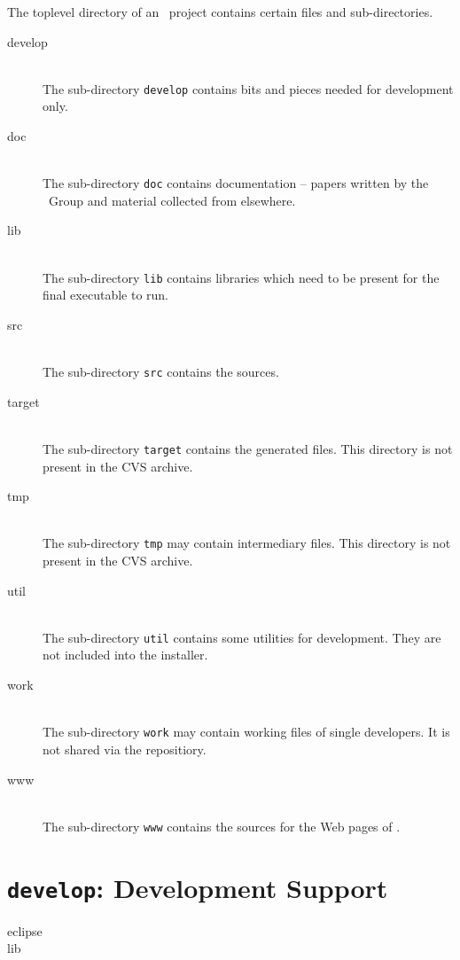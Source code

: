 \documentclass{extex-doc}
\begin{document}
The toplevel directory of an \ExTeX\ project contains certain files
and sub-directories.

\begin{description}
\item[develop] \ \\
  The sub-directory \texttt{develop} contains bits and pieces needed
  for development only.
\item[doc]  \ \\
  The sub-directory \texttt{doc} contains documentation -- papers
  written by the \ExTeX\ Group and material collected from elsewhere.
\item[lib]  \ \\
  The sub-directory \texttt{lib} contains libraries which need to be
  present for the final executable to run.
\item[src]  \ \\
  The sub-directory \texttt{src} contains the sources.
\item[target]  \ \\
  The sub-directory \texttt{target} contains the generated files. This
  directory is not present in the CVS archive.
\item[tmp]  \ \\
  The sub-directory \texttt{tmp} may contain intermediary files. This
  directory is not present in the CVS archive.
\item[util]  \ \\
  The sub-directory \texttt{util} contains some utilities for
  development. They are not included into the installer.
\item[work]  \ \\
  The sub-directory \texttt{work} may contain working files of single
  developers. It is not shared via the repositiory.
\item[www]  \ \\
  The sub-directory \texttt{www} contains the sources for the Web pages
  of \ExTeX.
\end{description}

\section{\texttt{develop}: Development Support}

\begin{description}
\item[eclipse] 
\item[lib] 
\end{description}
\end{document}
